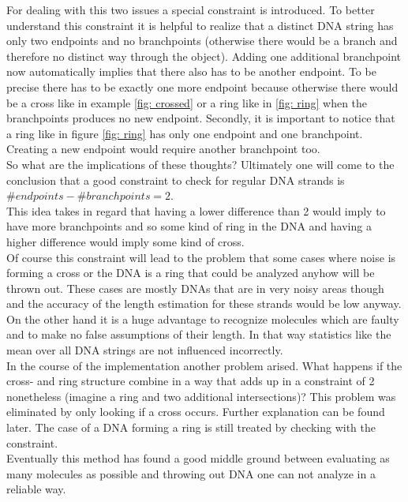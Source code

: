 \documentclass{article}
\begin{document}
For dealing with this two issues a special constraint is introduced. To better understand this constraint it is helpful to realize that a distinct DNA string has only two endpoints and no branchpoints (otherwise there would be a branch and therefore no distinct way through the object). Adding one additional branchpoint now automatically implies that there also has to be another endpoint. To be precise there has to be exactly one more endpoint because otherwise there would be a cross like in example \ref{fig: crossed} or a ring like in \ref{fig: ring} when the branchpoints produces no new endpoint. Secondly, it is important to notice that a ring like in figure \ref{fig: ring} has only one endpoint and one branchpoint. Creating a new endpoint would require another branchpoint too.\\
So what are the implications of these thoughts? Ultimately one will come to the conclusion that a good constraint to check for regular DNA strands is $\#endpoints - \#branchpoints = 2$. \\
This idea takes in regard that having a lower difference than 2 would imply to have more branchpoints and so some kind of ring in the DNA and having a higher difference would imply some kind of cross. \\
Of course this constraint will lead to the problem that some cases where noise is forming a cross or the DNA is a ring that could be analyzed anyhow will be thrown out. These cases are mostly DNAs that are in very noisy areas though and the accuracy of the length estimation for these strands would be low anyway. On the other hand it is a huge advantage to recognize molecules which are faulty and to make no false assumptions of their length. In that way statistics like the mean over all DNA strings are not influenced incorrectly. \\
In the course of the implementation another problem arised. What happens if the cross- and ring structure combine in a way that adds up in a constraint of 2 nonetheless (imagine a ring and two additional intersections)? This problem was eliminated by only looking if a cross occurs. Further explanation can be found later. The case of a DNA forming a ring is still treated by checking with the constraint.\\
Eventually this method has found a good middle ground between evaluating as many molecules as possible and throwing out DNA one can not analyze in a reliable way.
\end{document}
